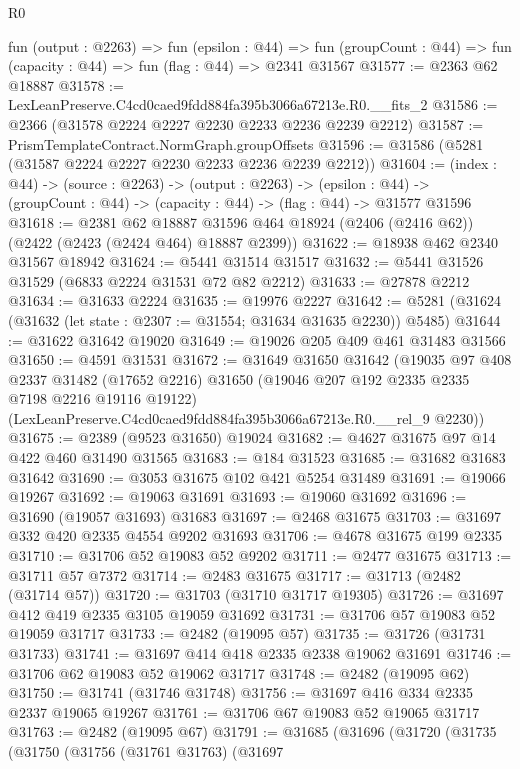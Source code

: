 \begin{lexlean}{R0}
\begin{coremodule}
  fun (output : @2263) =>
  fun (epsilon : @44) =>
  fun (groupCount : @44) => fun (capacity : @44) => fun (flag : @44) => @2341 @31567
@31577 := @2363 @62 @18887
@31578 := LexLeanPreserve.C4cd0caed9fdd884fa395b3066a67213e.R0.__fits_2
@31586 := @2366 (@31578 @2224 @2227 @2230 @2233 @2236 @2239 @2212)
@31587 := PrismTemplateContract.NormGraph.groupOffsets
@31596 := @31586 (@5281 (@31587 @2224 @2227 @2230 @2233 @2236 @2239 @2212))
@31604 := (index : @44) ->
  (source : @2263) ->
  (output : @2263) ->
  (epsilon : @44) -> (groupCount : @44) -> (capacity : @44) -> (flag : @44) -> @31577 @31596
@31618 := @2381
    @62
    @18887
    @31596
    @464
    @18924
    (@2406 (@2416 @62))
    (@2422 (@2423 (@2424 @464) @18887 @2399))
@31622 := @18938 @462 @2340 @31567 @18942
@31624 := @5441 @31514 @31517
@31632 := @5441 @31526 @31529 (@6833 @2224 @31531 @72 @82 @2212)
@31633 := @27878 @2212
@31634 := @31633 @2224
@31635 := @19976 @2227
@31642 := @5281 (@31624 (@31632 (let state : @2307 := @31554; @31634 @31635 @2230)) @5485)
@31644 := @31622 @31642 @19020
@31649 := @19026 @205 @409 @461 @31483 @31566
@31650 := @4591 @31531
@31672 := @31649
    @31650
    @31642
    (@19035
      @97
      @408
      @2337
      @31482
      (@17652 @2216)
      @31650
      (@19046 @207 @192 @2335 @2335 @7198 @2216 @19116 @19122)
      (LexLeanPreserve.C4cd0caed9fdd884fa395b3066a67213e.R0.__rel_9 @2230))
@31675 := @2389 (@9523 @31650) @19024
@31682 := @4627 @31675 @97 @14 @422 @460 @31490 @31565
@31683 := @184 @31523
@31685 := @31682 @31683 @31642
@31690 := @3053 @31675 @102 @421 @5254 @31489
@31691 := @19066 @19267
@31692 := @19063 @31691
@31693 := @19060 @31692
@31696 := @31690 (@19057 @31693) @31683
@31697 := @2468 @31675
@31703 := @31697 @332 @420 @2335 @4554 @9202 @31693
@31706 := @4678 @31675 @199 @2335
@31710 := @31706 @52 @19083 @52 @9202
@31711 := @2477 @31675
@31713 := @31711 @57 @7372
@31714 := @2483 @31675
@31717 := @31713 (@2482 (@31714 @57))
@31720 := @31703 (@31710 @31717 @19305)
@31726 := @31697 @412 @419 @2335 @3105 @19059 @31692
@31731 := @31706 @57 @19083 @52 @19059 @31717
@31733 := @2482 (@19095 @57)
@31735 := @31726 (@31731 @31733)
@31741 := @31697 @414 @418 @2335 @2338 @19062 @31691
@31746 := @31706 @62 @19083 @52 @19062 @31717
@31748 := @2482 (@19095 @62)
@31750 := @31741 (@31746 @31748)
@31756 := @31697 @416 @334 @2335 @2337 @19065 @19267
@31761 := @31706 @67 @19083 @52 @19065 @31717
@31763 := @2482 (@19095 @67)
@31791 := @31685
    (@31696
      (@31720
        (@31735
          (@31750
            (@31756
              (@31761 @31763)
              (@31697

\end{coremodule}
\end{lexlean}
